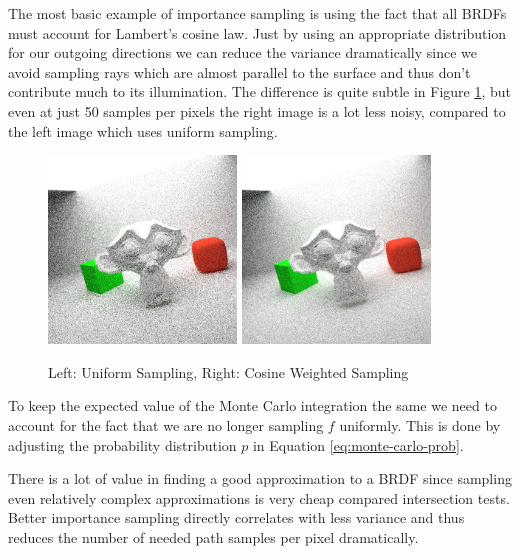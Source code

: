 \documentclass{ACGSeminar}
\begin{document}
The most basic example of importance sampling is using the fact that all BRDFs must account for Lambert's cosine law. Just by using an appropriate distribution for our outgoing directions we can reduce the variance dramatically since we avoid sampling rays which are almost parallel to the surface and thus don't contribute much to its illumination. The difference is quite subtle in Figure \ref{fig:rendering-cos-weighted}, but even at just 50 samples per pixels the right image is a lot less noisy, compared to the left image which uses uniform sampling.

\begin{figure}[htb!]
  \centering
  \includegraphics[width=5cm,natwidth=512,natheight=512]{figures/50_spp_uniform.png}
  \includegraphics[width=5cm,natwidth=512,natheight=512]{figures/50_spp_cosine_weighted.png}
  \caption{Left: Uniform Sampling, Right: Cosine Weighted Sampling}
  \label{fig:rendering-cos-weighted}
\end{figure}

To keep the expected value of the Monte Carlo integration the same we need to account for the fact that we are no longer sampling $f$ uniformly. This is done by adjusting the probability distribution $p$ in Equation \eqref{eq:monte-carlo-prob}.

There is a lot of value in finding a good approximation to a BRDF since sampling even relatively complex approximations is very cheap compared intersection tests. Better importance sampling directly correlates with less variance and thus reduces the number of needed path samples per pixel dramatically.
\end{document}
